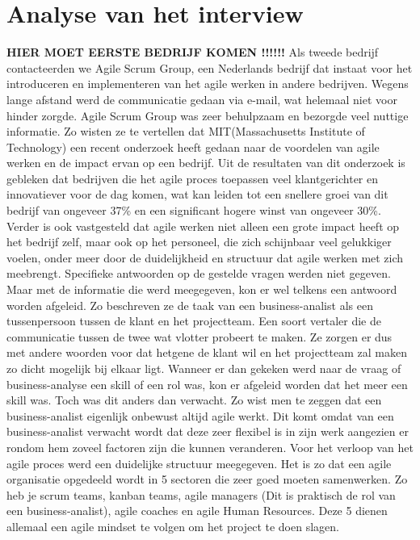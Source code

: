 \documentclass{hogent-article}
\begin{document}
\section{Analyse van het interview}
\textbf{HIER MOET EERSTE BEDRIJF KOMEN !!!!!!}\newline
Als tweede bedrijf contacteerden we Agile Scrum Group, een Nederlands bedrijf dat instaat voor het introduceren en implementeren van het agile werken in andere bedrijven. Wegens lange afstand werd de communicatie gedaan via e-mail, wat helemaal niet voor hinder zorgde. Agile Scrum Group was zeer behulpzaam en bezorgde veel nuttige informatie. Zo wisten ze te vertellen dat MIT(Massachusetts Institute of Technology) een recent onderzoek heeft gedaan naar de voordelen van agile werken en de impact ervan op een bedrijf.\newline
Uit de resultaten van dit onderzoek is gebleken dat bedrijven die het agile proces toepassen veel klantgerichter en innovatiever voor de dag komen, wat kan leiden tot een snellere groei van dit bedrijf van ongeveer 37\% en een significant hogere winst van ongeveer 30\%. \newline
Verder is ook vastgesteld dat agile werken niet alleen een grote impact heeft op het bedrijf zelf, maar ook op het personeel, die zich schijnbaar veel gelukkiger voelen, onder meer door de duidelijkheid en structuur dat agile werken met zich meebrengt.\newline
Specifieke antwoorden op de gestelde vragen werden niet gegeven. Maar met de informatie die werd meegegeven, kon er wel telkens een antwoord worden afgeleid. Zo beschreven ze de taak van een business-analist als een tussenpersoon tussen de klant en het projectteam. Een soort vertaler die de communicatie tussen de twee wat vlotter probeert te maken. Ze zorgen er dus met andere woorden voor dat hetgene de klant wil en het projectteam zal maken zo dicht mogelijk bij elkaar ligt. \newline
Wanneer er dan gekeken werd naar de vraag of business-analyse een skill of een rol was, kon er afgeleid worden dat het meer een skill was. Toch was dit anders dan verwacht. Zo wist men te zeggen dat een business-analist eigenlijk onbewust altijd agile werkt. Dit komt omdat van een business-analist verwacht wordt dat deze zeer flexibel is in zijn werk aangezien er rondom hem zoveel factoren zijn die kunnen veranderen.\newline
Voor het verloop van het agile proces werd een duidelijke structuur meegegeven. Het is zo dat een agile organisatie opgedeeld wordt in 5 sectoren die zeer goed moeten samenwerken. Zo heb je scrum teams, kanban teams, agile managers (Dit is praktisch de rol van een business-analist), agile coaches en agile Human Resources. Deze 5 dienen allemaal een agile mindset te volgen om het project te doen slagen. \newline
\end{document}
